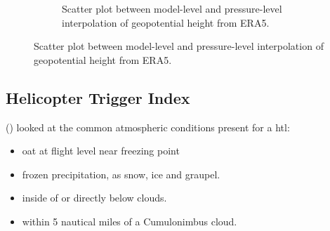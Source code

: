 \begin{figure}
\begin{subfigure}[h]{0.45\textwidth}
    \caption{Scatter plot between model-level and pressure-level interpolation of geopotential height from ERA5.}
    \label{fig:mlvsplgeopot}
    \end{subfigure}
\end{figure}



\subsection{Helicopter Trigger Index }\label{sec:hti}

(\cite{lande1999}) looked at the common atmospheric conditions present for a \acrshort{htl}:
\begin{itemize}
 \item \acrfull{oat} at flight level near freezing point 
 \item frozen precipitation, as snow, ice and graupel.
 \item inside of or directly below clouds.
 \item within 5 nautical miles of a Cumulonimbus cloud.
\end{itemize}

